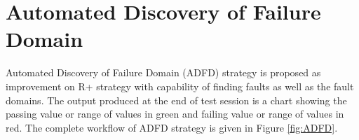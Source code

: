 \documentclass[runningheads,a4paper]{llncs}
\begin{document}


\section{Automated Discovery of Failure Domain}\label{sec:adfd}

Automated Discovery of Failure Domain (ADFD) strategy is proposed as improvement on R+ strategy with capability of finding faults as well as the fault domains. The output produced at the end of test session is a chart showing the passing value or range of values in green and failing value or range of values in red. The complete workflow of ADFD strategy is given in Figure \ref{fig:ADFD}.
\end{document}
